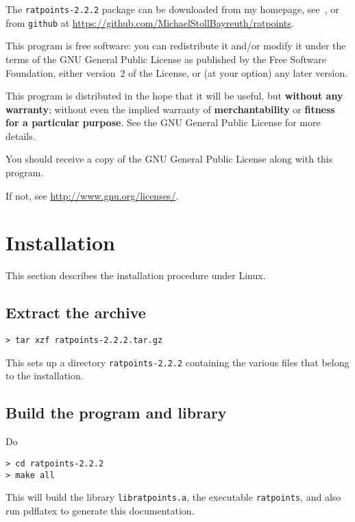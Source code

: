 \documentclass[12pt,a4paper,oneside]{amsart}
\newcommand{\rpversion}{2.2.2} %
\begin{document}
The \texttt{ratpoints-\rpversion} package can be downloaded from my homepage,
see~\cite{ratpoints}, or from \texttt{github} at
\url{https://github.com/MichaelStollBayreuth/ratpoints}.

This program is free software: you can redistribute it and/or modify
it under the terms of the GNU General Public License as published
by the Free Software Foundation, either version~2 of the License, or
(at your option) any later version.

This program is distributed in the hope that it will be useful,
but \textbf{without any warranty}; without even the implied warranty of
\textbf{merchantability} or \textbf{fitness for a particular purpose}. See the
GNU General Public License for more details.

You should receive a copy of the GNU General Public License
along with this program.

If not, see \url{http://www.gnu.org/licenses/}.


\section{Installation}

This section describes the installation procedure under Linux.

\subsection{Extract the archive}

\begin{verbatim}
> tar xzf ratpoints-2.2.2.tar.gz
\end{verbatim}

This sets up a directory \texttt{ratpoints-\rpversion} containing the various
files that belong to the installation.

\subsection{Build the program and library}

Do

\begin{verbatim}
> cd ratpoints-2.2.2
> make all
\end{verbatim}

This will build the library \texttt{libratpoints.a}, the executable
\texttt{ratpoints}, and also run pdf\/latex to generate this documentation.
\end{document}
